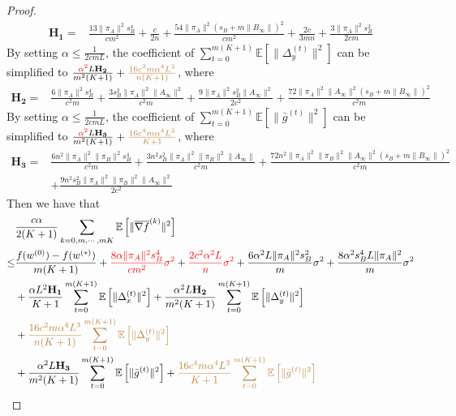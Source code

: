 \documentclass{article}
\newcommand{\EE}[1]{\mathbb{E}\left[#1\right]}
\newcommand{\norm}[1]{\| #1 \|}
\begin{document}
\begin{proof}
  \begin{align*}
    \mathbf{H_1}=&\frac{13\norm{\pi_A}^2s_B^4}{cm^2}+\frac{c}{2n}+\frac{54\norm{\pi_A}^2(s_B+m\norm{B_{\infty}})^2}{cm^2}+\frac{2c}{3mn}+\frac{3\norm{\pi_A}^2s_B^2}{2cm}
  \end{align*}
  By setting $\alpha \leq \frac{1}{2cmL}$, the coefficient of $\sum_{t=0}^{m(K+1)}\EE{\norm{\Delta_y^{(t)}}^2}$ can be simplified to $\frac{\textcolor{red}{\alpha^2}L\mathbf{H_2}}{m^2(K+1)}+\textcolor{brown}{\frac{16c^2m\alpha^4L^3}{n(K+1)}}$, where
  \begin{align*}
    \mathbf{H_2}=&\frac{6\norm{\pi_A}^2s_B^4}{c^2m}+\frac{3s_B^2\norm{\pi_A}^2\norm{A_{\infty}}^2}{c^2m}+\frac{9\norm{\pi_A}^2s_B^2\norm{A_{\infty}}^2}{2c^2}+\frac{72\norm{\pi_A}^2\norm{A_{\infty}}^2(s_B+m\norm{B_{\infty}})^2}{c^2m}
  \end{align*}
  By setting $\alpha \leq \frac{1}{2cmL}$, the coefficient of $\sum_{t=0}^{m(K+1)}\EE{\norm{\bar{g}^{(t)}}^2}$ can be simplified to $\frac{\textcolor{red}{\alpha^2}L\mathbf{H_3}}{m^2(K+1)}+\textcolor{brown}{\frac{16c^4m\alpha^4L^3}{K+1}}$, where
  \begin{align*}
    \mathbf{H_3}=&\frac{6n^2\norm{\pi_A}^2\norm{\pi_B}^2s_B^4}{c^2m}+\frac{3n^2s_B^2\norm{\pi_A}^2\norm{\pi_B}^2\norm{A_{\infty}}}{c^2m}+\frac{72n^2\norm{\pi_A}^2\norm{\pi_B}^2\norm{A_{\infty}}^2(s_B+m\norm{B_{\infty}})^2}{c^2m}\\&+\frac{9n^2s_B^2\norm{\pi_A}^2\norm{\pi_B}^2\norm{A_{\infty}}^2}{2c^2}
  \end{align*}
 Then we have that 
  \begin{align*}
    &\frac{c\alpha }{2(K+1)}\sum_{k=0,m,\cdots,mK}\EE{\norm{\overline{\nabla f}^{(k)}}^2}
  \\\leq& \frac{f(w^{(0)})-f(w^{(*)})}{m(K+1)}+\textcolor{red}{\frac{8\alpha \norm{\pi_A}^2s_B^4}{cm^2}\sigma^2}+\textcolor{red}{ \frac{2c^2\alpha^2L}{n}\sigma^2}+\frac{6\alpha^2L\norm{\pi_A}^2s_B^2}{m}\sigma^2+\frac{8\alpha^2s_B^4L\norm{\pi_A}^2}{m}\sigma^2\\&+\frac{\alpha L^2\mathbf{H_1}}{K+1}\sum_{t=0}^{m(K+1)}\EE{\norm{\Delta_x^{(t)}}^2}+\frac{\alpha^2 L \mathbf{H_2}}{m^2(K+1)}\sum_{t=0}^{m(K+1)}\EE{\norm{\Delta_y^{(t)}}^2}\\&+\textcolor{brown}{\frac{16c^2m\alpha^4L^3}{n(K+1)}\sum_{t=0}^{m(K+1)}\EE{\norm{\Delta_y^{(t)}}^2}}\\&+\frac{\alpha^2 L \mathbf{H_3}}{m^2(K+1)}\sum_{t=0}^{m(K+1)}\EE{\norm{\bar{g}^{(t)}}^2}+\textcolor{brown}{\frac{16c^4m\alpha^4L^3}{K+1}\sum_{t=0}^{m(K+1)}\EE{\norm{\bar{g}^{(t)}}^2}}
  \end{align*}
  

\end{proof}
\end{document}
